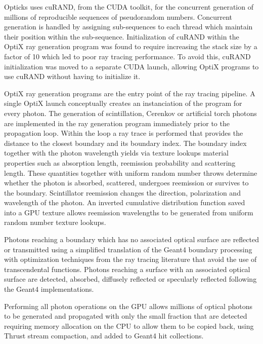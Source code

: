 \documentclass[a4paper]{jpconf}
\begin{document}
Opticks uses cuRAND\cite{curandURL}, from the CUDA toolkit, 
for the concurrent generation of millions of reproducible sequences of pseudorandom numbers. Concurrent generation is handled by assigning 
sub-sequences to each thread which maintain their position within the sub-sequence. Initialization of cuRAND within the 
OptiX ray generation program was found to require increasing the stack size by a factor of 10 which led to 
poor ray tracing performance. To avoid this, cuRAND initialization was moved to a separate CUDA launch, allowing 
OptiX programs to use cuRAND without having to initialize it.

OptiX ray generation programs are the entry point of the ray tracing pipeline. 
A single OptiX launch conceptually creates an instanciation of the program for every photon. 
The generation of scintillation, Cerenkov or artificial torch photons 
are implemented in the ray generation program immediately prior to the propagation loop.
Within the loop a ray trace is performed that provides the distance to the closest boundary and its boundary index.
The boundary index together with the photon wavelength yields via texture lookups material properties 
such as absorption length, reemission probability and scattering length. 
These quantities together with uniform random number throws determine 
whether the photon is absorbed, scattered, undergoes reemission or survives to the boundary. 
Scintillator reemission changes the direction, polarization and wavelength of the photon. 
An inverted cumulative distribution function saved into a GPU texture allows reemission wavelengths 
to be generated from uniform random number texture lookups.

Photons reaching a boundary which has no associated optical surface are reflected or 
transmitted using a simplified translation of the Geant4 boundary processing 
with optimization techniques from the ray tracing literature that avoid the 
use of transcendental functions. Photons reaching a surface with an associated optical 
surface are detected, absorbed, diffusely reflected or specularly reflected following 
the Geant4 implementations. 

Performing all photon operations on the GPU allows millions of optical photons 
to be generated and propagated with only the small fraction that are detected 
requiring memory allocation on the CPU to allow them to 
be copied back, using Thrust stream compaction, and added to Geant4 hit collections.
\end{document}
